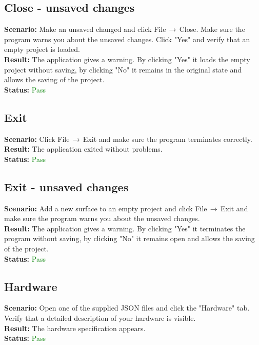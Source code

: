 \documentclass[a4paper, 11pt, article]{report}
\begin{document}
\subsection{Close - unsaved changes}

\noindent \textbf{Scenario:} Make an unsaved changed and click File$\,\to\,$Close. Make sure the program warns you about the unsaved changes. Click "Yes" and verify that an empty project is loaded.
\\
\noindent \textbf{Result:} The application gives a warning. By clicking "Yes" it loads the empty project without saving, by clicking "No" it remains in the original state and allows the saving of the project.
\\
\noindent \textbf{Status:} \textcolor{green}{Pass}

\subsection{Exit}

\noindent \textbf{Scenario:} Click File$\,\to\,$Exit and make sure the program terminates correctly.
\\
\noindent \textbf{Result:} The application exited without problems.
\\
\noindent \textbf{Status:} \textcolor{green}{Pass}

\subsection{Exit - unsaved changes}

\noindent \textbf{Scenario:} Add a new surface to an empty project and click File$\,\to\,$Exit and make sure the program warns you about the unsaved changes.
\\
\noindent \textbf{Result:} The application gives a warning. By clicking "Yes" it terminates the program without saving, by clicking "No" it remains open and allows the saving of the project.
\\
\noindent \textbf{Status:} \textcolor{green}{Pass}

\subsection{Hardware}

\noindent \textbf{Scenario:} Open one of the supplied JSON files and click the "Hardware" tab. Verify that a detailed description of your hardware is visible.
\\
\noindent \textbf{Result:} The hardware specification appears.
\\
\noindent \textbf{Status:} \textcolor{green}{Pass}
\end{document}
